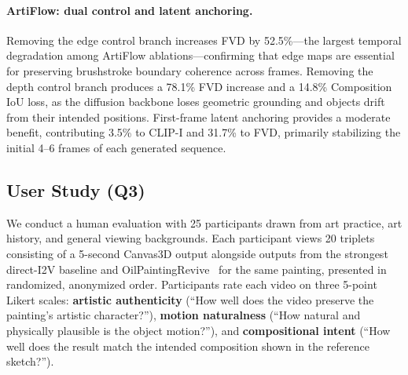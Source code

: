 \paragraph{ArtiFlow: dual control and latent anchoring.}
Removing the edge control branch increases FVD by 52.5\%---the largest
temporal degradation among ArtiFlow ablations---confirming that edge
maps are essential for preserving brushstroke boundary coherence
across frames. Removing the depth control branch produces a 78.1\% FVD
increase and a 14.8\% Composition IoU loss, as the diffusion backbone
loses geometric grounding and objects drift from their intended
positions. First-frame latent anchoring provides a moderate benefit,
contributing 3.5\% to CLIP-I and 31.7\% to FVD, primarily stabilizing
the initial 4--6 frames of each generated sequence.

\begin{table}[t]
\centering
\caption{\textbf{Ablation results.} Each row removes one component.}
\label{tab:ablations}
\end{table}

\subsection{User Study (Q3)}

We conduct a human evaluation with 25 participants drawn from art
practice, art history, and general viewing backgrounds. Each
participant views 20 triplets consisting of a 5-second Canvas3D
output alongside outputs from the strongest direct-I2V baseline and
OilPaintingRevive~\cite{oilpaintingrevive2026} for the same painting,
presented in randomized, anonymized order. Participants rate each
video on three 5-point Likert scales: \textbf{artistic authenticity}
(``How well does the video preserve the painting's artistic
character?''), \textbf{motion naturalness} (``How natural and
physically plausible is the object motion?''), and
\textbf{compositional intent} (``How well does the result match the
intended composition shown in the reference sketch?'').

